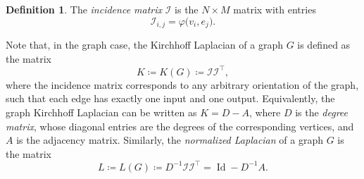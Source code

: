 \documentclass{article}
\DeclareMathOperator{\id}{Id}
\theoremstyle{plain}
\theoremstyle{definition}
\newtheorem{definition}[theorem]{Definition}
\theoremstyle{remark}
\begin{document}
\begin{definition}
    The \emph{incidence matrix} $\mathcal I$ is the $N\times M$ matrix with entries
    \[
    \mathcal I_{i,j} = \varphi\bigl(v_i,e_j\bigr).
    \]
\end{definition}
Note that, in the graph case, the Kirchhoff Laplacian of a graph $G$ is defined as the matrix $$K\coloneqq K(G) \coloneqq \mathcal I \mathcal I^\top,$$ where the incidence matrix corresponds to any arbitrary orientation of the graph, such that each edge has exactly one input and one output. Equivalently, the graph Kirchhoff Laplacian can be written as $K = D - A$, where $D$ is the \emph{degree matrix}, whose diagonal entries are the degrees of the corresponding vertices, and $A$ is the adjacency matrix. Similarly, the \emph{normalized Laplacian} of a graph $G$ is the matrix $$L \coloneqq L(G) \coloneqq D^{-1}\mathcal I \mathcal I^\top = \id - D^{-1}A.$$
\end{document}
